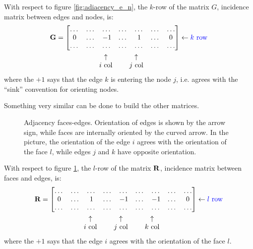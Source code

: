 With respect to figure \ref{fig:adiacency_e_n}, the $k$-row of the matrix
$G$, incidence matrix between edges and nodes, is:
\begin{align*}
  \Matrix{G} & = \begin{bmatrix}
    \dots & \dots & \dots  & \dots & \dots & \dots & \dots \\
    0     & \dots & -1     & \dots & 1     & \dots & 0     \\
    \dots & \dots & \dots  & \dots & \dots & \dots & \dots
  \end{bmatrix} \leftarrow \text{\color[rgb]{0,0,1}$k$ row} \\
  & \quad \begin{matrix}
    \qquad & \qquad & \mspace{-14mu}\uparrow       & \qquad & \mspace{-28mu}\uparrow       \\
    \qquad & \qquad & \mspace{-14mu}\text{$i$ col} & \qquad & \mspace{-28mu}\text{$j$ col}
  \end{matrix}
\end{align*}
where the $+1$ says that the edge $k$ is entering the node $j$,
i.e. agrees with the ``sink'' convention for orienting nodes.

Something very similar can be done to build the other matrices.

\begin{figure}[htbp]
  \begin{center}
    \resizebox{4cm}{!}{}
  \end{center}
  \caption{Adjacency faces-edges. Orientation of edges is shown by the
  arrow sign, while faces are internally oriented by the curved
  arrow. In the picture, the orientation of the edge $i$ agrees with
  the orientation of the face $l$, while edges $j$ and $k$ have
  opposite orientation.}
  \label{fig:adiacency_f_e}
\end{figure}

With respect to figure \ref{fig:adiacency_f_e}, the $l$-row of the
matrix $\mathbf{R}$, incidence matrix between faces and edges, is:
\begin{align*}
  \Matrix{R} & = \begin{bmatrix}
    \dots & \dots & \dots  & \dots & \dots & \dots & \dots & \dots    & \dots \\
    0     & \dots & 1      & \dots & -1    & \dots & -1    & \dots    & 0     \\
    \dots & \dots & \dots  & \dots & \dots & \dots & \dots & \dots    & \dots
  \end{bmatrix} \leftarrow \text{\color[rgb]{0,0,1}$l$ row} \\
  & \quad \begin{matrix}
    \qquad & \qquad & \mspace{-14mu}\uparrow       & \qquad & \mspace{-28mu}\uparrow       & \qquad & \mspace{-28mu}\uparrow \\
    \qquad & \qquad & \mspace{-14mu}\text{$i$ col} & \qquad & \mspace{-28mu}\text{$j$ col} & \qquad & \mspace{-28mu}\text{$k$ col}
  \end{matrix}
\end{align*}
where the $+1$ says that the edge $i$ agrees with the orientation of
the face $l$.

